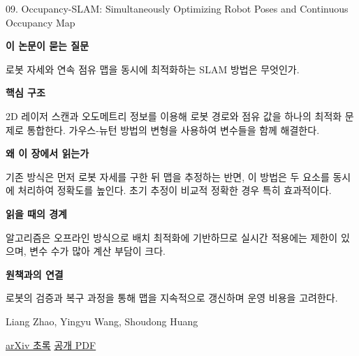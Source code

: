 \documentclass[11pt,openany]{book}
\begin{document}
\begin{termcard}{09. Occupancy-SLAM: Simultaneously Optimizing Robot Poses and Continuous Occupancy Map}

\par

\medskip

{\sffamily\bfseries\color{deepblue} 이 논문이 묻는 질문}\par

로봇 자세와 연속 점유 맵을 동시에 최적화하는 SLAM 방법은 무엇인가.

\smallskip

{\sffamily\bfseries\color{deepblue} 핵심 구조}\par

2D 레이저 스캔과 오도메트리 정보를 이용해 로봇 경로와 점유 값을 하나의 최적화 문제로 통합한다. 가우스-뉴턴 방법의 변형을 사용하여 변수들을 함께 해결한다.

\smallskip

{\sffamily\bfseries\color{deepblue} 왜 이 장에서 읽는가}\par

기존 방식은 먼저 로봇 자세를 구한 뒤 맵을 추정하는 반면, 이 방법은 두 요소를 동시에 처리하여 정확도를 높인다. 초기 추정이 비교적 정확한 경우 특히 효과적이다.

\smallskip

{\sffamily\bfseries\color{coral} 읽을 때의 경계}\par

알고리즘은 오프라인 방식으로 배치 최적화에 기반하므로 실시간 적용에는 제한이 있으며, 변수 수가 많아 계산 부담이 크다.

\smallskip

{\sffamily\bfseries\color{teal} 원책과의 연결}\par

로봇의 검증과 복구 과정을 통해 맵을 지속적으로 갱신하며 운영 비용을 고려한다.

\medskip

{\footnotesize\color{muted} Liang Zhao, Yingyu Wang, Shoudong Huang\par

\href{https://arxiv.org/abs/2405.10743}{arXiv 초록} \quad \href{https://arxiv.org/pdf/2405.10743}{공개 PDF}\par}

\end{termcard}
\end{document}
